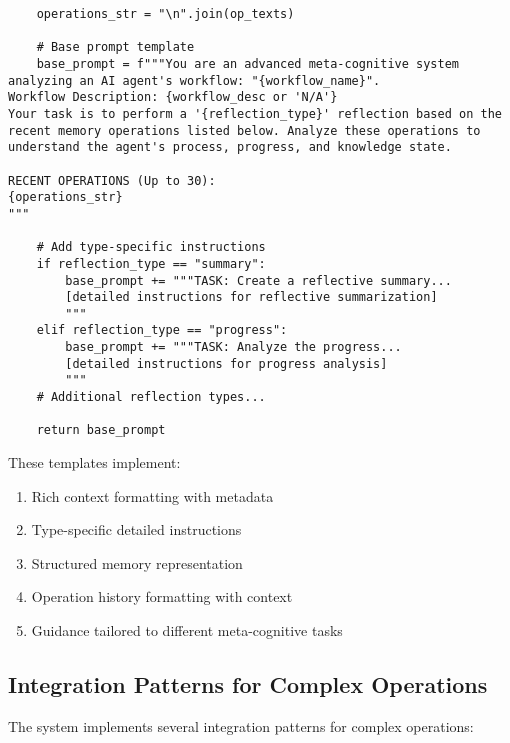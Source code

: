 \documentclass[12pt,a4paper]{article}
\begin{document}
\begin{pageablecode}
\begin{verbatim}
    operations_str = "\n".join(op_texts)

    # Base prompt template
    base_prompt = f"""You are an advanced meta-cognitive system analyzing an AI agent's workflow: "{workflow_name}".
Workflow Description: {workflow_desc or 'N/A'}
Your task is to perform a '{reflection_type}' reflection based on the recent memory operations listed below. Analyze these operations to understand the agent's process, progress, and knowledge state.

RECENT OPERATIONS (Up to 30):
{operations_str}
"""

    # Add type-specific instructions
    if reflection_type == "summary":
        base_prompt += """TASK: Create a reflective summary...
        [detailed instructions for reflective summarization]
        """
    elif reflection_type == "progress":
        base_prompt += """TASK: Analyze the progress...
        [detailed instructions for progress analysis]
        """
    # Additional reflection types...

    return base_prompt
\end{verbatim}
\end{pageablecode}
These templates implement:
\begin{enumerate}[label=\arabic*.]
    \item Rich context formatting with metadata
    \item Type-specific detailed instructions
    \item Structured memory representation
    \item Operation history formatting with context
    \item Guidance tailored to different meta-cognitive tasks
\end{enumerate}

\subsection*{Integration Patterns for Complex Operations}

The system implements several integration patterns for complex operations:
\end{document}
